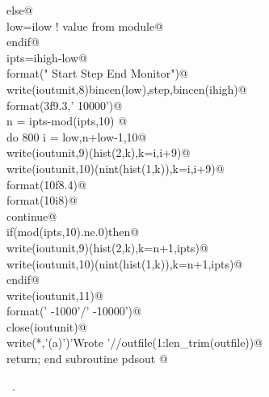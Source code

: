 \documentclass[10pt,a4paper,notitlepage]{article}
\begin{document}
\begin{flushleft}
\begin{minipage}{\linewidth}
\begin{list}{}{}
\mbox{}\verb@      else@\\
\mbox{}\verb@       low=ilow         ! value from module@\\
\mbox{}\verb@      endif@\\
\mbox{}\verb@      ipts=ihigh-low@\\
\mbox{}     format("   Start     Step      End     Monitor")@\\
\mbox{}\verb@      write(ioutunit,8)bincen(low),step,bincen(ihigh)@\\
\mbox{}     format(3f9.3,'    10000')@\\
\mbox{}\verb@      n = ipts-mod(ipts,10) @\\
\mbox{}\verb@      do 800 i = low,n+low-1,10@\\
\mbox{}\verb@        write(ioutunit,9)(hist(2,k),k=i,i+9)@\\
\mbox{}\verb@        write(ioutunit,10)(nint(hist(1,k)),k=i,i+9)@\\
\mbox{}     format(10f8.4)@\\
\mbox{}    format(10i8)@\\
\mbox{}   continue@\\
\mbox{}\verb@      if(mod(ipts,10).ne.0)then@\\
\mbox{}\verb@       write(ioutunit,9)(hist(2,k),k=n+1,ipts)@\\
\mbox{}\verb@       write(ioutunit,10)(nint(hist(1,k)),k=n+1,ipts)@\\
\mbox{}\verb@      endif@\\
\mbox{}\verb@      write(ioutunit,11)@\\
\mbox{}    format('   -1000'/'  -10000')@\\
\mbox{}\verb@      close(ioutunit)@\\
\mbox{}\verb@      write(*,'(a)')'Wrote '//outfile(1:len_trim(outfile))@\\
\mbox{}\verb@      return; end subroutine pdsout                                         @{\NWsep}
\end{list}
\vspace{-1.5ex}
\footnotesize
\begin{list}{}{\setlength{\itemsep}{-\parsep}\setlength{\itemindent}{-\leftmargin}}
\item \NWtxtMacroRefIn\ .

\item{}
\end{list}
\end{minipage}\vspace{4ex}
\end{flushleft}
\end{document}

